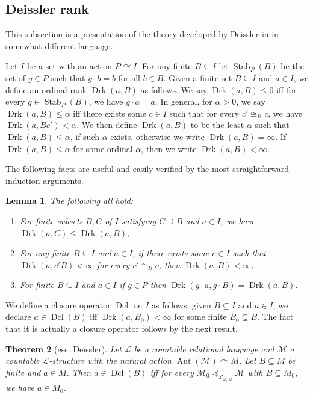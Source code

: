 \documentclass[12pt]{amsart}
\theoremstyle{plain}
\newtheorem{theorem}{Theorem}[section]
\newtheorem{lemma}[theorem]{Lemma}
\theoremstyle{definition}
\newcommand{\isom}{\cong}
\newcommand{\mcL}{\mathcal{L}}
\newcommand{\mcM}{\mathcal{M}}
\DeclareMathOperator{\Aut}{Aut}
\DeclareMathOperator{\Stab}{Stab}
\DeclareMathOperator{\Drk}{Drk}
\DeclareMathOperator{\Dcl}{Dcl}
\begin{document}
\subsection{Deissler rank}

This subsection is a presentation of the theory developed by Deissler in \cite{Deissler1997} in somewhat different language.

Let $I$ be a set with an action $P \curvearrowright I$.
For any finite $B \subseteq I$ let $\Stab_P(B)$ be the set of $g \in P$ such that $g \cdot b = b$ for all $b \in B$.
Given a finite set $B \subseteq I$ and $a \in I$, we define an ordinal rank $\Drk(a, B)$ as follows.
We say $\Drk(a, B) \le 0$ iff for every $g \in \Stab_P(B)$, we have $g \cdot a = a$.
In general, for $\alpha > 0$, we say $\Drk(a, B) \le \alpha$ iff there exists some $c \in I$ such that for every $c' \isom_B c$, we have $\Drk(a, Bc') < \alpha$.
We then define $\Drk(a,B)$ to be the least $\alpha$ such that $\Drk(a, B) \le \alpha$, if such $\alpha$ exists, otherwise we write $\Drk(a, B) = \infty$.
If $\Drk(a, B) \le \alpha$ for some ordinal $\alpha$, then we write $\Drk(a, B) < \infty$.

The following facts are useful and easily verified by the most straightforward induction arguments.

\begin{lemma}\label{lem:deissler_rank_fact}
    The following all hold:
    \begin{enumerate}
    \item For finite subsets $B, C$ of $I$ satisfying $C \supseteq B$ and $a \in I$, we have $\Drk(a, C) \le \Drk(a, B)$;
    \item For any finite $B \subseteq I$ and $a \in I$, if there exists some $c \in I$ such that $\Drk(a, c'B) < \infty$ for every $c' \isom_B c$, then $\Drk(a, B) < \infty$;
    \item For finite $B \subseteq I$ and $a \in I$ if $g \in P$ then $\Drk(g \cdot a, g \cdot B) = \Drk(a, B)$.
    \end{enumerate}
\end{lemma}

We define a closure operator $\Dcl$ on $I$ as follows: given $B \subseteq I$ and $a \in I$, we declare $a \in \Dcl(B)$ iff $\Drk(a, B_0) < \infty$ for some finite $B_0 \subseteq B$.
The fact that it is actually a closure operator follows by the next result.

\begin{theorem}[ess. Deissler]\label{th:deissler}
Let $\mcL$ be a countable relational language and $\mcM$ a countable $\mcL$-structure with the natural action $\Aut(\mcM) \curvearrowright M$. 
Let $B \subseteq M$ be finite and $a \in M$.
Then $a \in \Dcl(B)$ iff for every $\mcM_0 \preceq_{\mcL_{\omega_1, \omega}} \mcM$ with $B \subseteq M_0$, we have $a \in M_0$.
\end{theorem}
\end{document}

